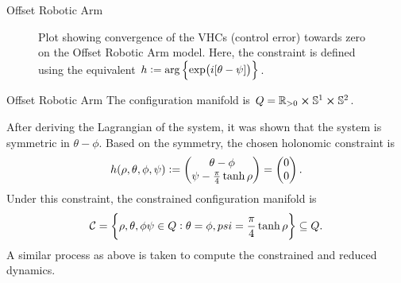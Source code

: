 \documentclass[xcolor=dvipsnames]{beamer}
\renewcommand{\cite}[1]{\footnote<.->[frame]{\fullcite{#1}}}
\begin{document}
\begin{frame}{Offset Robotic Arm}
\begin{figure}[h]
    \caption{Plot showing convergence of the VHCs (control error) towards zero on the Offset Robotic Arm model. Here, the constraint is defined using the equivalent $h:=\arg\cbr{\exp(i[\theta-\psi])}$.}
    \label{fig:graph-robotarm}
\end{figure}
\end{frame}


\begin{frame}{Offset Robotic Arm}
The configuration manifold is $Q=\mathbb{R}_{>0}\cross\mathbb{S}^1\cross\mathbb{S}^2$.

After deriving the Lagrangian of the system, it was shown that the system is symmetric in $\theta-\phi$. Based on the symmetry, the chosen holonomic constraint is
\begin{align}
    h(\rho,\theta,\phi,\psi):=\pmqty{\theta-\phi\\\psi-\frac{\pi}{4}\tanh \rho}=\pmqty{0\\0}.
\end{align}
Under this constraint, the constrained configuration manifold is
\begin{align}
    \mathcal{C}=\cbr{\rho,\theta,\phi\psi\in Q:\theta=\phi,psi=\frac{\pi}{4}\tanh \rho}\subseteq Q.
\end{align}
A similar process as above is taken to compute the constrained and reduced dynamics.
\end{frame}
\end{document}
